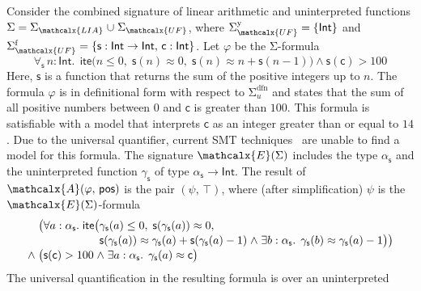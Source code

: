 \documentclass[runningheads,a4paper]{llncs}
\newcommand{\con}[1]{\mathsf{#1}}
\let\const=\con
\let\oldSigma=\Sigma
\def\Sigma{\mathrm{\oldSigma}}
\let\oldwedge=\wedge
\def\wedge{\mathrel{\oldwedge}}
\newcommand{\teq}{\approx}
\newcommand{\conv}{\mathcalx{A}}
\newcommand{\ssorts}[1]{#1^\mathrm{y}}
\newcommand{\sfuns}[1]{#1^\mathrm{f}}
\newcommand{\sfundefs}[1]{#1^\mathrm{dfn}}
\newcommand{\sortint}{\ty{Int}}
\newcommand{\ppos}{\con{pos}}
\newcommand\ty[1]{\con{#1}}
\newcommand{\ltrue}{\top}
\newcommand{\lite}{\con{ite}}
\newcommand\concret{\gamma} %
\newcommand{\forallf}[1]{\forall_{\!#1\:}}
\newcommand{\farg}[1]{\concret_{#1}}
\newcommand{\fargsort}[1]{\alpha_{#1}}
\newcommand{\Sigmalia}{\Sigma_{\mathcalx{LIA}}}
\newcommand{\extendsig}[1]{\mathcalx{E}( #1 )}
\newcommand{\euf}{\ensuremath{\mathcalx{UF}}\xspace}
\begin{document}
\begin{example}
\label{ex:translation}
Consider the combined signature of linear arithmetic and uninterpreted
functions $\Sigma = \Sigmalia \mathrel{\cup} \Sigma_{\euf}$, where
$\ssorts{\Sigma_{\euf}} = \{ \sortint \}$ and
$\sfuns{\Sigma_{\euf}} = \{ \con{s} : { \sortint \rightarrow \sortint },\, \const{c} : { \sortint } \}$.
Let $\varphi$ be the $\Sigma$-formula
\begin{equation} \label{eq:ex-before}
\forallf{\con{s}} n : {\sortint}.\;\, \lite\bigl( n \leq 0,\; \con{s}(n) \teq 0,\;
  \con{s}( n ) \teq n + \con{s}( n - 1 ) \bigr) \wedge \con{s}( \con{c} ) > 100
\end{equation}
%
Here, $\const{s}$ is a function that returns the sum of the positive integers
up to $n$. The formula $\varphi$ is in definitional form with
respect to $\sfundefs{\Sigma_u}$ and states that the sum of all
positive numbers between $0$ and $\const{c}$ is greater than $100$. This formula is
satisfiable with a model that interprets $\const{c}$ as an integer greater than or
equal to $14$. Due to the universal quantifier,
current SMT techniques~\cite{GeDeM-CAV-09, ReyEtAl-1-RR-13,reynolds-et-al-2013} are unable to find
a model for this formula. The signature $\extendsig{\Sigma}$ includes the type
$\fargsort{\con{s}}$ and the uninterpreted function $\farg{\con{s}}$ of type $\fargsort{\con{s}}
\rightarrow \sortint$. The result of $\conv( \varphi,\, \ppos )$ is the pair $(
\psi,\, \ltrue )$, where (after simplification) $\psi$ is the
$\extendsig{\Sigma}$-formula
%
\begin{equation} \label{eq:ex-after}
\!\begin{aligned}[c]
  & \phantom{{\wedge}\; }\bigl(
      \forall a : \fargsort{\con{s}}.\; \lite\bigl(
        \!\begin{aligned}[t]
         &  \farg{\con{s}}( a ) \leq 0,\;
          \con{s}(\farg{\con{s}}( a )) \teq 0,\;
\\[-\jot]
  & \con{s}(\farg{\con{s}}( a )) \teq \farg{\con{s}}( a ) + \con{s}( \farg{\con{s}}( a )-1 )
    \wedge \exists b : {\fargsort{\con{s}}}.\;\, \farg{\con{s}}( b ) \teq \farg{\con{s}}( a )-1 \bigr) \bigr)
\end{aligned}
\\[-\jot]
 & {\wedge}\; \bigl( \con{s}( \con{c} ) > 100 \wedge \exists a : {\fargsort{\con{s}}}.\;\, \farg{\con{s}}( a ) \teq \con{c} \bigr)
\end{aligned}
\end{equation}
%
The universal quantification in the resulting formula is over an uninterpreted

\end{example}
\end{document}
